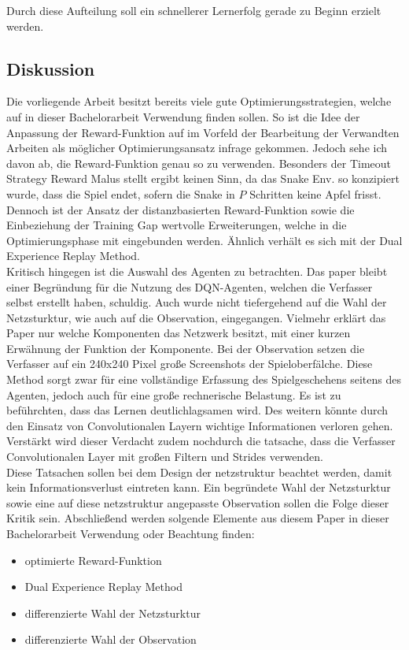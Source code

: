 Durch diese Aufteilung soll ein schnellerer Lernerfolg gerade zu Beginn erzielt werden.

\subsection{Diskussion}
Die vorliegende Arbeit besitzt bereits viele gute Optimierungsstrategien, welche auf in dieser Bachelorarbeit Verwendung finden sollen. So ist die Idee der Anpassung der Reward-Funktion auf im Vorfeld der Bearbeitung der Verwandten Arbeiten als möglicher Optimierungsansatz infrage gekommen. Jedoch sehe ich davon ab, die Reward-Funktion genau so zu verwenden. Besonders der Timeout Strategy Reward Malus stellt ergibt keinen Sinn, da das Snake Env. so konzipiert wurde, dass die Spiel endet, sofern die Snake in $P$ Schritten keine Apfel frisst.\\
Dennoch ist der Ansatz der distanzbasierten Reward-Funktion sowie die Einbeziehung der Training Gap wertvolle Erweiterungen, welche in die Optimierungsphase mit eingebunden werden. Ähnlich verhält es sich mit der Dual Experience Replay Method.\\
Kritisch hingegen ist die Auswahl des Agenten zu betrachten. Das paper bleibt einer Begründung für die Nutzung des DQN-Agenten, welchen die Verfasser selbst erstellt haben, schuldig. Auch wurde nicht tiefergehend auf die Wahl der Netzsturktur, wie auch auf die Observation, eingegangen. Vielmehr erklärt das Paper nur welche Komponenten das Netzwerk besitzt, mit einer kurzen Erwähnung der Funktion der Komponente. Bei der Observation setzen die Verfasser auf ein 240x240 Pixel große Screenshots der Spieloberfälche. Diese Method sorgt zwar für eine vollständige Erfassung des Spielgeschehens seitens des Agenten, jedoch auch für eine große rechnerische Belastung. Es ist zu beführchten, dass das Lernen deutlichlagsamen wird. Des weitern könnte durch den Einsatz von Convolutionalen Layern wichtige Informationen verloren gehen. Verstärkt wird dieser Verdacht zudem nochdurch die tatsache, dass die Verfasser Convolutionalen Layer mit großen Filtern und Strides verwenden.\\
Diese Tatsachen sollen bei dem Design der netzstruktur beachtet werden, damit kein Informationsverlust eintreten kann. Ein begründete Wahl der Netzsturktur sowie eine auf diese netzstruktur angepasste Observation sollen die Folge dieser Kritik sein. Abschließend werden solgende Elemente aus diesem Paper in dieser Bachelorarbeit Verwendung oder Beachtung finden:
\begin{itemize}
	\item optimierte Reward-Funktion
	\item Dual Experience Replay Method 
	\item differenzierte Wahl der Netzsturktur
	\item differenzierte Wahl der Observation
\end{itemize}

